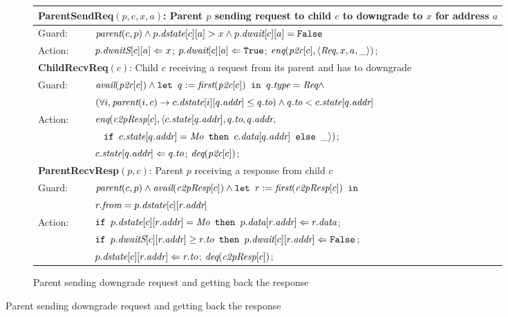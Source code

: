 \begin{figure}
\begin{subfigure}{\textwidth}
\centering
\begin{tabular}{|ll|}
\hline
\multicolumn{2}{|l|}{\textbf{ParentSendReq}$(p, c, x, a)$: Parent $p$ sending request to child $c$ to downgrade to $x$ for address $a$}\\
\hline
Guard: & $\textit{parent}(c,p) \wedge p.\textit{dstate}[c][a] > x \wedge p.\textit{dwait}[c][a] = \texttt{False}$\\
\hline
Action: & $p.\textit{dwaitS}[c][a] \Leftarrow x$; $p.\textit{dwait}[c][a] \Leftarrow \texttt{True}$; $\textit{enq}(\textit{p2c}[c], \langle \textit{Req}, x, a, \_ \rangle)$;\\
\hline
\hline
\multicolumn{2}{|p{\textwidth}|}{\textbf{ChildRecvReq}$(c)$: Child $c$ receiving a request from its parent and has to downgrade}\\
\hline
Guard: & 
$\textit{avail}(\textit{p2c}[c]) \wedge \texttt{let } q := \textit{first}(\textit{p2c}[c]) \texttt{ in } q.\textit{type} = \textit{Req} \wedge$ \\
& $(\forall i, \textit{parent}(i, c) \rightarrow c.\textit{dstate}[i][q.\textit{addr}] \le q.\textit{to}) \wedge q.\textit{to} < c.\textit{state}[q.\textit{addr}]$\\
\hline
Action: & $\textit{enq}(\textit{c2pResp}[c], \langle c.\textit{state}[q.\textit{addr}], q.\textit{to}, q.\textit{addr},$\\
& $\;\;\;%
\myif c.\state[q.\addr] = \Mo \mythen c.\data[q.\addr] \myelse \_\rangle)$;\\
& $c.\textit{state}[q.\textit{addr}] \Leftarrow q.\textit{to}$; $\textit{deq}(\textit{p2c}[c])$;\\
\hline
\hline
\multicolumn{2}{|l|}{\textbf{ParentRecvResp}$(p, c)$: Parent $p$ receiving a response from child $c$}\\
\hline
Guard: & 
$\textit{parent}(c,p) \wedge \textit{avail}(\textit{c2pResp}[c]) \wedge \texttt{let } r := \textit{first}(\textit{c2pResp}[c]) \texttt{ in }$\\
& $r.\textit{from} = p.\textit{dstate}[c][r.\textit{addr}]$\\
\hline
Action: & $\texttt{if } p.\textit{dstate}[c][r.\textit{addr}] = \textit{Mo} \texttt{ then } p.\textit{data}[r.\textit{addr}] \Leftarrow r.\textit{data}$;\\
&$\texttt{if } p.\textit{dwaitS}[c][r.\textit{addr}] \ge r.\textit{to} \texttt{ then } p.\textit{dwait}[c][r.\textit{addr}] \Leftarrow \texttt{False} $;\\
& $p.\textit{dstate}[c][r.\textit{addr}] \Leftarrow r.\textit{to}$; $\textit{deq}(\textit{c2pResp}[c])$;\\
\hline
\end{tabular}
\caption{Parent sending downgrade request and getting back the response}
\label{parentside}
\end{subfigure}


\end{figure}
